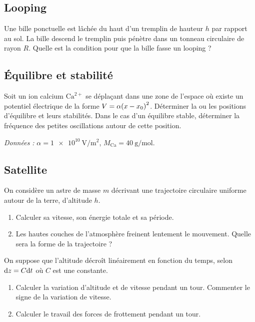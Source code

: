 \documentclass[a4paper,french,bookmarks]{article}
\begin{document}
    \subsection{Looping}

    Une bille ponctuelle est lâchée du haut d'un tremplin de hauteur $h$ par rapport au sol. La bille descend le tremplin puis pénètre dans un tonneau circulaire de rayon $R$. Quelle est la condition pour que la bille fasse un looping ?

    \subsection{Équilibre et stabilité}

    Soit un ion calcium $\textrm{Ca}^{2+}$ se déplaçant dans une zone de l'espace où existe un potentiel électrique de la forme $V = \alpha\!\left(x - x_0\right)^2$. Déterminer la ou les positions d'équilibre et leurs stabilités. Dans le cas d'un équilibre stable, déterminer la fréquence des petites oscillations autour de cette position.
    
    \emph{Données :} $\alpha = \qty{1e10}{\volt \per \meter\squared}$, $M_\text{Ca} = \qty{40}{\g \per \mol}$.

    \subsection{Satellite}

    On considère un astre de masse $m$ décrivant une trajectoire circulaire uniforme autour de la terre, d'altitude $h$.

    \begin{enumerate}
        \item Calculer sa vitesse, son énergie totale et sa période.

        \item Les hautes couches de l'atmosphère freinent lentement le mouvement. Quelle sera la forme de la trajectoire ?
    \end{enumerate}

    On suppose que l'altitude décroît linéairement en fonction du temps, selon $\mathrm d z = C\mathrm d t$ où $C$ est une constante. 

    \begin{enumerate}[resume]
        \item Calculer la variation d'altitude et de vitesse pendant un tour. Commenter le signe de la variation de vitesse.

        \item Calculer le travail des forces de frottement pendant un tour.
    \end{enumerate}
\end{document}
